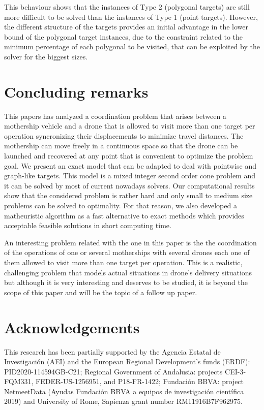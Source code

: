 \documentclass{itor}
\theoremstyle{definition}
\theoremstyle{remark}
\begin{document}
This behaviour shows that the instances of Type 2 (polygonal targets) are still more difficult to be solved than the instances of Type 1 (point targets). However, the different structure of the targets provides an initial advantage in the lower bound of the polygonal target instances, due to the constraint related to the minimum percentage of each polygonal to be visited, that can be exploited by the solver for the biggest sizes.






\section{Concluding remarks} \label{conclusions}
This papers has analyzed a coordination problem that arises between a mothership vehicle and a drone that is allowed to visit more than one target per operation syncronizing their displacements to minimize travel distances. The mothership can move freely in a continuous space so that the drone can be launched and recovered at any point that is convenient to optimize the problem goal. We present an exact model that  can be adapted to deal with pointwise and graph-like targets. This model is a mixed integer second order cone problem and it can be solved by most of current nowadays solvers. Our computational results show that the considered problem is rather hard and only small to medium size problems can be  solved to optimality. For that reason, we also developed a matheuristic algorithm as a fast alternative to exact methods which provides acceptable feasible solutions in short computing time.

An interesting problem related with the one in this paper is the  the coordination of the operations of one or several motherships with several drones each one of them  allowed to visit more than one target per operation. This is a realistic, challenging  problem that models actual situations in drone's delivery situations but although it is very interesting and deserves to be studied, it  is beyond the scope of this paper and will be the topic of a follow up paper.

\section*{Acknowledgements}
This research has been partially supported by the Agencia Estatal de Investigación (AEI) and the European Regional Development’s funds (ERDF): PID2020-114594GB-C21; 
Regional Government of Andalusia: projects CEI-3-FQM331, FEDER-US-1256951, and P18-FR-1422; Fundación BBVA: project NetmeetData (Ayudas
Fundación BBVA a equipos de investigación científica 2019) and University of Rome, Sapienza grant number RM11916B7F962975.
\end{document}
